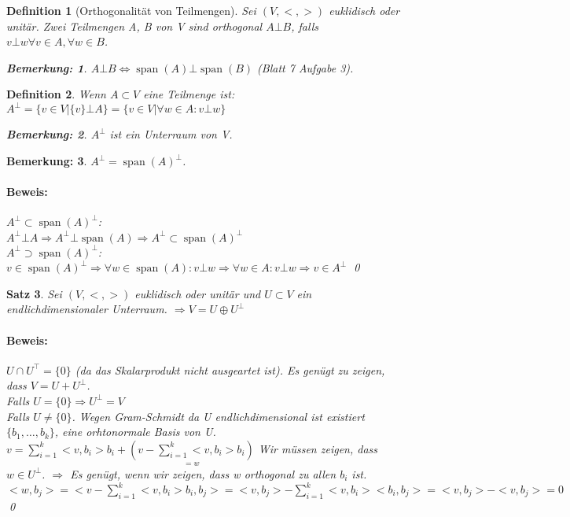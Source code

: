 \documentclass{report}
\DeclareMathOperator{\Span}{span}
\theoremstyle{customrem}
\newtheorem*{bemerkung}{Bemerkung\textnormal:}
\theoremstyle{customdef}
\newtheorem{definition}{Definition}[chapter]
\newtheorem{satz}[definition]{Satz}
\renewenvironment{proof}{\paragraph{Beweis: }}{\qed}
\theoremstyle{customenv}
\begin{document}
\begin{definition}[Orthogonalit\"at von Teilmengen]
  Sei \((V, <, >)\) euklidisch oder unit\"ar. Zwei Teilmengen A, B von V sind
  orthogonal \(A \bot B\), falls \(v \bot w \forall v \in A, \forall w \in B\).
  \begin{bemerkung}
    \(A \bot B \Leftrightarrow \Span(A) \bot \Span(B)\)
    (Blatt 7 Aufgabe 3).
  \end{bemerkung}
\end{definition}

\begin{definition}
  Wenn \(A \subset V\) eine Teilmenge ist:\\
  \(A^\bot = \{v \in V | \{v\} \bot A\} = \{v \in V | \forall w \in A : v \bot w\}\)
  \begin{bemerkung}
    \(A^\bot\) ist ein Unterraum von V.
  \end{bemerkung}
\end{definition}

\begin{bemerkung}
  \(A^\bot = \Span(A)^\bot\).
  \begin{proof}\hfill\break
    \(A^\bot \subset \Span(A)^\bot\):\\
    \(A^\bot \bot A
    \Rightarrow A^\bot \bot \Span(A)
    \Rightarrow A^\bot \subset \Span(A)^\bot\)\\
    \(A^\bot \supset \Span(A)^\bot\):\\
    \(v \in \Span(A)^\bot
    \Rightarrow \forall  w \in \Span(A) : v \bot w
    \Rightarrow \forall w \in A : v \bot w
    \Rightarrow v \in A^\bot
    \)
  \end{proof}
\end{bemerkung}

\begin{satz}
  Sei \((V, <, >)\) euklidisch oder unit\"ar und \(U \subset V\) ein
  endlichdimensionaler Unterraum.
  \(\Rightarrow V = U \oplus U^\bot\)
  \begin{proof}
    \(U \cap U^\top = \{0\}\) (da das Skalarprodukt nicht ausgeartet ist).
    Es gen\"ugt zu zeigen, dass \(V = U + U^\bot\).\\
    Falls \(U = \{0\} \Rightarrow U^\bot = V\)\\
    Falls \(U \neq \{0\}\). Wegen Gram-Schmidt da U endlichdimensional ist
    existiert \(\{b_1, \dots, b_k\}\), eine orhtonormale Basis von U.\\
    \(v = \sum_{i=1}^k <v, b_i> b_i
          + \underset{=w}{(v - \sum_{i=1}^k <v, b_i> b_i)}\)
    Wir m\"ussen zeigen, dass \(w \in U^\bot\).
    \(\Rightarrow\) Es gen\"ugt, wenn wir zeigen, dass w orthogonal zu allen
    \(b_i\) ist.\\
    \(<w, b_j> = <v - \sum_{i=1}^k <v, b_i>b_i, b_j>
    = <v, b_j> - \sum_{i=1}^k <v, b_i> <b_i, b_j>
    = <v, b_j> - <v, b_j>
    = 0
    \)
  \end{proof}
\end{satz}
\end{document}
